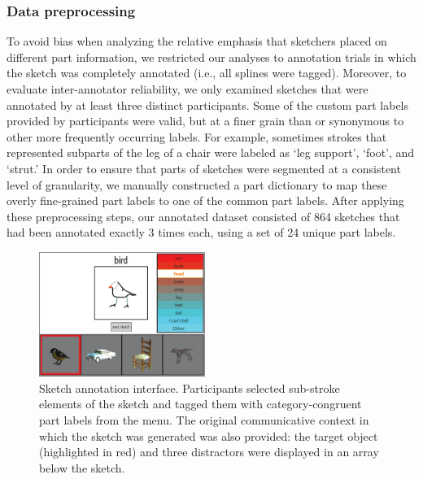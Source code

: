 \documentclass[10pt,letterpaper]{article}
\begin{document}
\subsubsection{Data preprocessing}

To avoid bias when analyzing the relative emphasis that sketchers placed on different part information, we restricted our analyses to annotation trials in which the sketch was completely annotated (i.e., all splines were tagged). 
Moreover, to evaluate inter-annotator reliability, we only examined sketches that were annotated by at least three distinct participants. 
Some of the custom part labels provided by participants were valid, but at a finer grain than or synonymous to other more frequently occurring labels. 
For example, sometimes strokes that represented subparts of the leg of a chair were labeled as `leg support', `foot', and `strut.'
In order to ensure that parts of sketches were segmented at a consistent level of granularity, we manually constructed a part dictionary to map these overly fine-grained part labels to one of the common part labels. 
After applying these preprocessing steps, our annotated dataset consisted of 864 sketches that had been annotated exactly 3 times each, using a set of 24 unique part labels. 

\begin{figure}[htbp]
\centering
\includegraphics[width=0.48\textwidth]{figures/4_annotation_interface.pdf}
\caption{Sketch annotation interface. Participants selected sub-stroke elements of the sketch and tagged them with category-congruent part labels from the menu. The original communicative context in which the sketch was generated was also provided: the target object (highlighted in red) and three distractors were displayed in an array below the sketch.}
\label{annotation_interface}
\end{figure}
\end{document}
